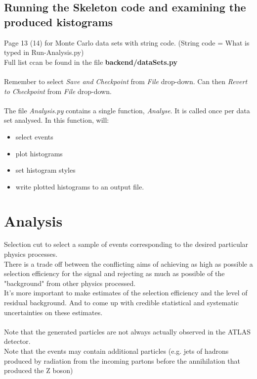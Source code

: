 \subsection{Running the Skeleton code and examining the produced kistograms}
Page 13 (14) for Monte Carlo data sets with string code.  (String code = What is typed in Run-Analysis.py)\\
Full list ccan be found in the file \textbf{backend/dataSets.py}\\
\\
Remember to select \textit{Save and Checkpoint} from \textit{File} drop-down.
Can then \textit{Revert to Checkpoint} from \textit{File} drop-down.
\\\\
The file \textit{Analysis.py} contains a single function, \textit{Analyse}.
It is called once per data set analysed.
In this function, will:
\begin{itemize}
    \item select events
    \item plot histograms
    \item set histogram styles
    \item write plotted histograms to an output file.
\end{itemize}

\section{Analysis}

Selection cut to select a sample of events corresponding to the desired particular physics processes.\\
There is a trade off  between  the conflicting aims of achieving as high as possible a selection efficiency for the signal and rejecting as much as possible of the "background" from other physics processed.\\
It's more important to make estimates of the selection efficiency and the level of residual background.
And to come up with credible statistical and systematic uncertainties on these estimates.
\\\\
Note that the generated particles are not always actually observed in  the ATLAS detector.\\
Note that the events may contain additional particles (e.g. jets of hadrons produced by radiation from the incoming partons before the annihilation that produced the Z boson)

